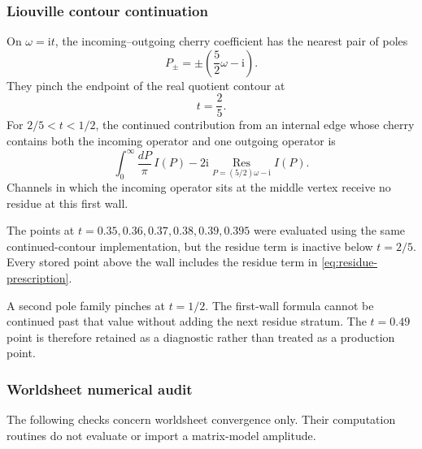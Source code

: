 \documentclass[11pt]{article}
\newcommand{\ii}{\mathrm{i}}
\newcommand{\Res}{\operatorname*{Res}}
\begin{document}
\subsubsection{Liouville contour continuation}
\label{sec:contour-continuation}

On $\omega=\ii t$, the incoming--outgoing cherry coefficient has the nearest
pair of poles
\begin{equation}
  P_{\pm}=\pm\left(\frac{5}{2}\omega-\ii\right).
  \label{eq:first-poles}
\end{equation}
They pinch the endpoint of the real quotient contour at
\begin{equation}
  t=\frac{2}{5}.
  \label{eq:first-wall}
\end{equation}
For $2/5<t<1/2$, the continued contribution from an internal edge whose
cherry contains both the incoming operator and one outgoing operator is
\begin{equation}
  \int_0^\infty\frac{dP}{\pi}\,I(P)
  -2\ii\Res_{P=(5/2)\omega-\ii}I(P).
  \label{eq:residue-prescription}
\end{equation}
Channels in which the incoming operator sits at the middle vertex receive no
residue at this first wall.

The points at $t=0.35,0.36,0.37,0.38,0.39,0.395$ were evaluated using the
same continued-contour implementation, but the residue term is inactive
below $t=2/5$.  Every stored point above the wall includes the residue term
in \eqref{eq:residue-prescription}.

A second pole family pinches at $t=1/2$.  The first-wall formula cannot be
continued past that value without adding the next residue stratum.  The
$t=0.49$ point is therefore retained as a diagnostic rather than treated as
a production point.

\subsubsection{Worldsheet numerical audit}

The following checks concern worldsheet convergence only.  Their computation
routines do not evaluate or import a matrix-model amplitude.
\end{document}
